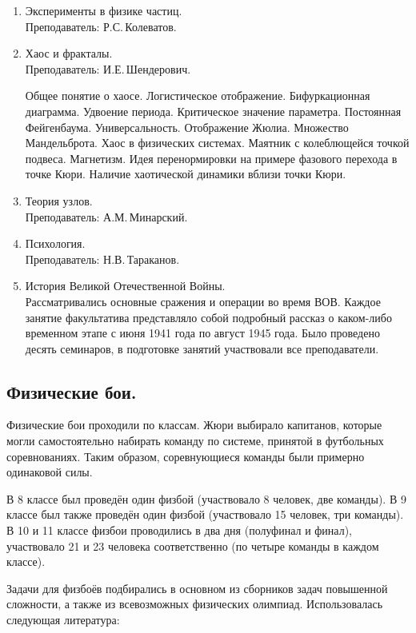 \documentclass[12pt,a4paper,oneside,draft]{scrartcl}
\begin{document}
\begin{enumerate}
\item Эксперименты в физике частиц.  \\ \textsf{Преподаватель: Р.С.\,Колеватов}.
\item Хаос и фракталы.\\ \textsf{Преподаватель: И.Е.\,Шендерович}.

  Общее понятие о хаосе. Логистическое отображение. Бифуркационная
  диаграмма. Удвоение периода. Критическое значение
  параметра. Постоянная Фейгенбаума. Универсальность. Отображение
  Жюлиа. Множество Мандельброта. Хаос в физических системах. Маятник с
  колеблющейся точкой подвеса. Магнетизм. Идея перенормировки на
  примере фазового перехода в точке Кюри. Наличие хаотической динамики
  вблизи точки Кюри.

\item Теория узлов. \\ \textsf{Преподаватель: А.М.\,Минарский}. 
\item Психология. \\ \textsf{Преподаватель: Н.В.\,Тараканов}. 
\item История Великой Отечественной Войны. \\

  Рассматривались основные сражения и операции во время ВОВ. Каждое
  занятие факультатива представляло собой подробный рассказ о
  каком-либо временном этапе с июня 1941 года по август 1945
  года. Было проведено десять семинаров, в подготовке занятий
  участвовали все преподаватели.
\end{enumerate}

\subsection{Физические бои.}
\label{sec:battles}

Физические бои проходили по классам. Жюри выбирало капитанов, которые
могли самостоятельно набирать команду по системе, принятой в
футбольных соревнованиях. Таким образом, соревнующиеся команды были
примерно одинаковой силы.

В 8 классе был проведён один физбой (участвовало 8 человек, две
команды). В 9 классе был также проведён один физбой (участвовало 15
человек, три команды). В 10 и 11 классе физбои проводились в два дня
(полуфинал и финал), участвовало 21 и 23 человека соответственно
(по четыре команды в каждом классе). 

Задачи для физбоёв подбирались в основном из сборников задач повышенной
сложности, а также из всевозможных физических олимпиад. Использовалась
следующая литература: 
\end{document}
